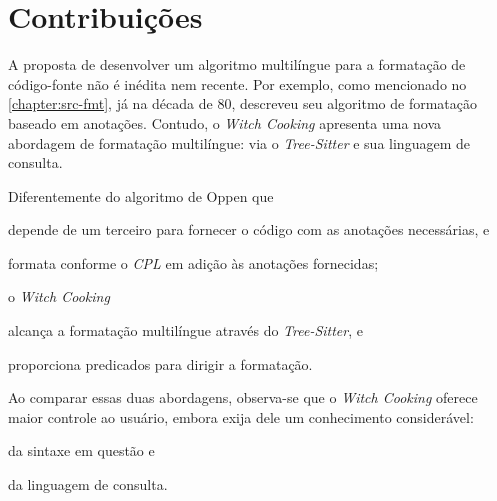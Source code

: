 \documentclass
  [11pt,a4paper,english,brazil,openright,sumario=tradicional,twoside]
  {abntex2}
\newcommand{\treesitter}{\textit{Tree-Sitter}\xspace}
\newcommand{\witchcooking}{\textit{Witch Cooking}\xspace}
\begin{document}

  \section{Contribuições}

  A proposta de desenvolver um algoritmo multilíngue para a formatação de
  código-fonte não é inédita nem recente. Por exemplo, como mencionado no
  \cref{chapter:src-fmt}, já na década de 80,
  \textcite{oppen-1980-prettyprinting} descreveu seu algoritmo de formatação
  baseado em anotações. Contudo, o \witchcooking apresenta uma nova abordagem
  de formatação multilíngue: via o \treesitter e sua linguagem de consulta.

  Diferentemente do algoritmo de Oppen que
  \begin{inparaenum}
    \item depende de um terceiro para fornecer o código com as anotações
          necessárias, e
    \item formata conforme o \textit{CPL} em adição às anotações fornecidas;
  \end{inparaenum}
  o \witchcooking
  \begin{inparaenum}
    \item alcança a formatação multilíngue através do \treesitter, e
    \item proporciona predicados para dirigir a formatação.
  \end{inparaenum}
  Ao comparar essas duas abordagens, observa-se que o \witchcooking oferece
  maior controle ao usuário, embora exija dele um conhecimento considerável:
  \begin{inparaenum}
    \item da sintaxe em questão e
    \item da linguagem de consulta.
  \end{inparaenum}
\end{document}
